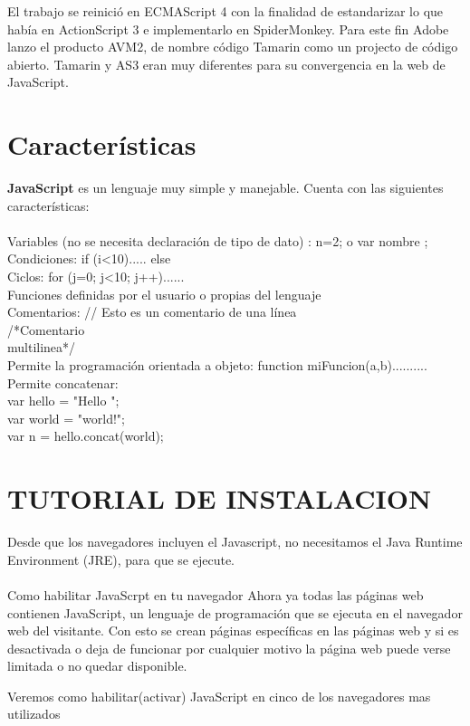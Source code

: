 \documentclass[11pt]{article} %
\begin{document}
El trabajo se reinició en ECMAScript 4 con la finalidad de estandarizar lo que había en ActionScript 3 e implementarlo en SpiderMonkey. Para este fin Adobe lanzo el producto AVM2, de nombre código Tamarin como un projecto de código abierto. Tamarin y AS3 eran muy diferentes para su convergencia en la web de JavaScript.\\


\section{Características}
{\bfseries JavaScript} es un lenguaje muy simple y manejable. Cuenta con las siguientes características:\\\\
Variables (no se necesita declaración de tipo de dato) : n=2; o var nombre ;\\
Condiciones: if (i<10){.....} else{}\\
Ciclos: for (j=0; j<10; j++){......}\\
Funciones definidas por el usuario o propias del lenguaje\\
Comentarios: // Esto es un comentario de una línea\\
/*Comentario\\
multilinea*/   \\
Permite la programación orientada a objeto: function miFuncion(a,b){..........} \\
Permite concatenar:\\
var hello = "Hello "; \\
var world = "world!";\\
var n = hello.concat(world);

\section{TUTORIAL DE INSTALACION}
 Desde que los navegadores incluyen el Javascript, no necesitamos el Java Runtime Environment (JRE), para que se ejecute.
\\  \\
Como habilitar JavaScrpt en tu navegador 
Ahora ya todas las páginas web contienen  JavaScript, un lenguaje de programación que se ejecuta en el navegador web del visitante. Con esto se crean páginas específicas en las páginas web y si es desactivada o deja de funcionar por cualquier motivo la página web puede verse limitada o no quedar disponible.

Veremos como habilitar(activar) JavaScript en cinco de los navegadores mas utilizados



\lstset{language=Pascal}          %
\end{document}
